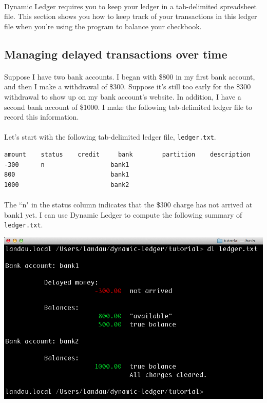 \documentclass{article}
\begin{document}
\begin{flushleft}
\paragraph{} Dynamic Ledger requires you to keep your ledger in a tab-delimited spreadsheet file. This section shows you how to keep track of your transactions in this ledger file when you're using the program to balance your checkbook.

\subsection{Managing delayed transactions over time}

\paragraph{} Suppose I have two bank accounts. I began with \$800 in my first bank account, and then I make a withdrawal of \$300. Suppose it's still too early for the \$300 withdrawal to show up on my bank account's website. In addition, I have a second bank account of \$1000. I make the following tab-delimited ledger file to record this information.

\paragraph{} Let's start with the following tab-delimited ledger file, {\tt ledger.txt}.

\begin{lstlisting}[title=ledger.txt]
amount    status	credit     bank        partition    description
-300      n                  bank1
800                          bank1
1000                         bank2
\end{lstlisting}

\paragraph{} The ``n" in the status column indicates that the \$300 charge has not arrived at bank1 yet. I can use Dynamic Ledger to compute the following summary of {\tt ledger.txt}.

\begin{center}
\includegraphics[scale=.45]{fig/sum0.png}
\end{center} 


\end{flushleft}
\end{document}
